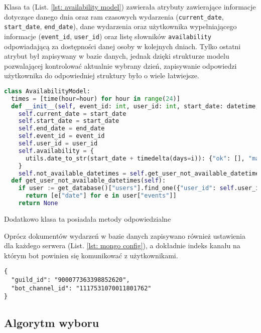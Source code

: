 \documentclass[11pt,a4paper]{article}
\begin{document}
Klasa ta (List. \ref{lst: availability model}) zawierała atrybuty zawierające informacje dotyczące danego dnia oraz ram czasowych wydarzenia (\texttt{current\_date}, \texttt{start\_date}, \texttt{end\_date}), dane wydarzenia oraz użytkownika wypełniającego informacje (\texttt{event\_id}, \texttt{user\_id}) oraz listę słowników \texttt{availability} odpowiadającą za dostępności danej osoby w kolejnych dniach. Tylko ostatni atrybut był zapisywany w bazie danych, jednak dzięki strukturze modelu pozwalającej kontrolować aktualnie wybrany dzień, zapisywanie odpowiedzi użytkownika do odpowiedniej struktury było o wiele łatwiejsze.

\begin{lstlisting}[language=Python,caption={Fragment klasy  "AvailabilityModel"},label={lst: availability model}]
class AvailabilityModel:
  times = [time(hour=hour) for hour in range(24)]
  def __init__(self, event_id: int, user_id: int, start_date: datetime, end_date: datetime) -> None:
    self.current_date = start_date
    self.start_date = start_date
    self.end_date = end_date
    self.event_id = event_id
    self.user_id = user_id
    self.availability = {
      utils.date_to_str(start_date + timedelta(days=i)): {"ok": [], "maybe": [], "no": []} for i in range((end_date - start_date).days + 1)
    }
    self.not_available_datetimes = self.get_user_not_available_datetimes()
  def get_user_not_available_datetimes(self):
    if user := get_database()["users"].find_one({"user_id": self.user_id}):
      return [e["date"] for e in user["events"]]
    return None
\end{lstlisting}

Dodatkowo klasa ta posiadała metody odpowiedzialne

Oprócz dokumentów wydarzeń w bazie danych zapisywano również ustawienia dla każdego serwera (List. \ref{lst: mongo config}), a dokładnie indeks kanału na którym bot powinien się komunikować z użytkownikami.

\begin{lstlisting}[caption={Dokument kolekcji "config"},label={lst: mongo config}]
{
  "guild_id": "900077363398852620",
  "bot_channel_id": "1117531070011801762"
}
\end{lstlisting}

\subsection{Algorytm wyboru}
\end{document}
